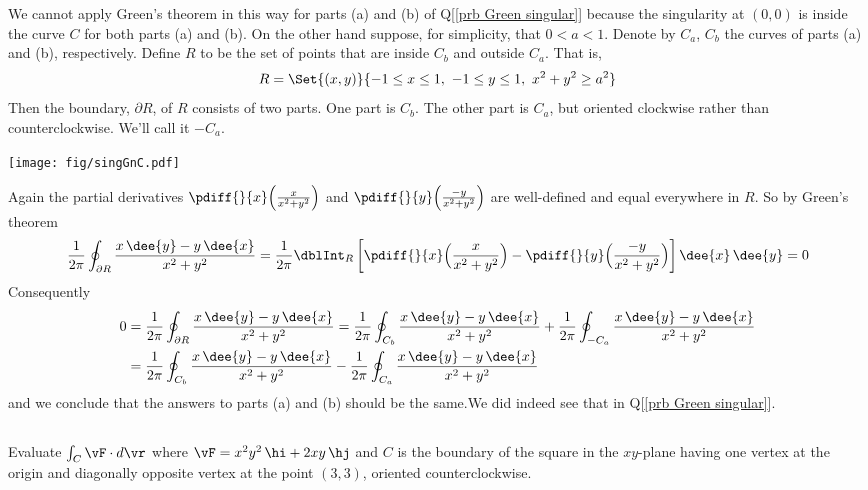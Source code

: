 \begin{solution}
We cannot apply Green's theorem
in this way for parts (a) and (b) of Q[\ref{prb Green singular}] because
the singularity at $(0,0)$ is inside the curve $C$ for both parts
(a) and (b). On the other hand suppose, for simplicity, that $0<a<1$.
Denote by $C_a$, $C_b$ the curves of parts (a) and (b),
respectively. Define $R$ to be the set of points that are inside $C_b$
and outside $C_a$. That is,
\begin{equation*}
R=\Set{(x,y)}{-1\le x \le 1,\ -1\le y\le 1,\ x^2+y^2\ge a^2 }
\end{equation*}
Then the boundary, $\partial R$, of $R$ consists of two parts.
One part is $C_b$.
The other part is $C_a$, but oriented clockwise rather than
counterclockwise. We'll call it $-C_a$.
\begin{center}
       \texttt{[image: fig/singGnC.pdf]}
\end{center}
Again the partial derivatives
$\pdiff{}{x}\Big( \frac{x}{x^2+y^2}\Big)$
and
$\pdiff{}{y}\Big( \frac{-y}{x^2+y^2}\Big)$
are well-defined and equal everywhere in $R$. So by Green's theorem
\begin{equation*}
\frac{1}{2\pi}\oint_{\partial R} \frac{x\,\dee{y}-y\,\dee{x}}{x^2+y^2}
=\frac{1}{2\pi}\dblInt_R\left[
   \pdiff{}{x}\Big( \frac{x}{x^2+y^2}\Big)
 -\pdiff{}{y}\Big( \frac{-y}{x^2+y^2}\Big)\right]\dee{x}\, \dee{y}
=0
\end{equation*}
Consequently
\begin{align*}
0 &= \frac{1}{2\pi}\oint_{\partial R} \frac{x\,\dee{y}-y\,\dee{x}}{x^2+y^2}
= \frac{1}{2\pi}\oint_{C_b} \frac{x\,\dee{y}-y\,\dee{x}}{x^2+y^2}
+ \frac{1}{2\pi}\oint_{-C_a} \frac{x\,\dee{y}-y\,\dee{x}}{x^2+y^2}
\\
&=\frac{1}{2\pi}\oint_{C_b} \frac{x\,\dee{y}-y\,\dee{x}}{x^2+y^2}
- \frac{1}{2\pi}\oint_{C_a} \frac{x\,\dee{y}-y\,\dee{x}}{x^2+y^2}
\end{align*}
and we conclude that the answers to parts (a) and (b) should be
the same.We did indeed see that in Q[\ref{prb Green singular}].
\end{solution}



\subsection*{\Procedural}

\begin{question}
Evaluate   $\int_C\vF\cdot d\vr$ where
$\vF = x^2y^2\,\hi + 2xy\,\hj$ and $C$ is the boundary of the square in the
$xy$-plane having one vertex at the origin and diagonally opposite vertex at the point $(3, 3)$, oriented counterclockwise.
\end{question}


